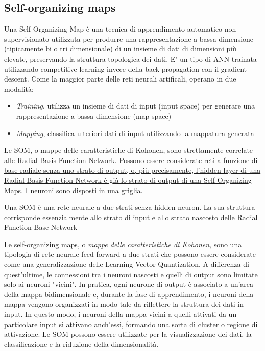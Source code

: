 \subsection{Self-organizing maps}
Una Self-Organizing Map è una tecnica di apprendimento automatico non supervisionato utilizzata per produrre una rappresentazione a bassa dimensione (tipicamente bi o tri dimensionale) di un insieme di dati di dimensioni più elevate, preservando la struttura topologica dei dati. 
E' un tipo di ANN trainata utilizzando competitive learning invece della back-propagation con il gradient descent. Come la maggior parte delle reti neurali artificali, operano in due modalità:
\begin{itemize}
    \item \textit{Training}, utilizza un insieme di dati di input (input space) per generare una rappresentazione a bassa dimensione (map space)
    \item \textit{Mapping}, classifica ulteriori dati di input utilizzando la mappatura generata
\end{itemize}

Le SOM, o mappe delle caratteristiche di Kohonen, sono strettamente correlate alle Radial Basis Function Network. \uline{Possono essere considerate reti a funzione di base radiale senza uno strato di output, o, più precisamente, l'hidden layer di una Radial Basis Function Network è già lo strato di output di una Self-Organizing Maps}. I neuroni sono disposti in una griglia.

Una SOM è una rete neurale a due strati senza hidden neuron. La sua struttura corrisponde essenzialmente allo strato di input e allo strato nascosto delle Radial Function Base Network

Le self-organizing maps, o \textit{mappe delle caratteristiche di Kohonen}, sono una tipologia di rete neurale feed-forward a due strati che possono essere considerate come una generalizzazione delle Learning Vector Quantization. A differenza di quest'ultime, le connessioni tra i neuroni nascosti e quelli di output sono limitate solo ai neuroni "vicini". In pratica, ogni neurone di output è associato a un'area della mappa bidimensionale e, durante la fase di apprendimento, i neuroni della mappa vengono organizzati in modo tale da riflettere la struttura dei dati in input. In questo modo, i neuroni della mappa vicini a quelli attivati da un particolare input si attivano anch'essi, formando una sorta di cluster o regione di attivazione. Le SOM possono essere utilizzate per la visualizzazione dei dati, la classificazione e la riduzione della dimensionalità.

